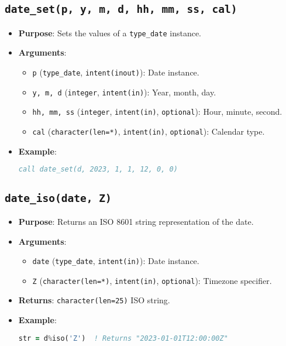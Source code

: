 \documentclass[12pt,a4paper]{report}
\begin{document}
\subsection{\texttt{date\_set(p, y, m, d, hh, mm, ss, cal)}}
\begin{itemize}
\item \textbf{Purpose}: Sets the values of a \texttt{type\_date} instance.
\item \textbf{Arguments}:
\begin{itemize}
\item \texttt{p} (\texttt{type\_date}, \texttt{intent(inout)}): Date instance.
\item \texttt{y, m, d} (\texttt{integer}, \texttt{intent(in)}): Year, month, day.
\item \texttt{hh, mm, ss} (\texttt{integer}, \texttt{intent(in)}, \texttt{optional}): Hour, minute, second.
\item \texttt{cal} (\texttt{character(len=*)}, \texttt{intent(in)}, \texttt{optional}): Calendar type.
\end{itemize}
\item \textbf{Example}:
\begin{lstlisting}[language=Fortran]
call date_set(d, 2023, 1, 1, 12, 0, 0)
\end{lstlisting}
\end{itemize}

\subsection{\texttt{date\_iso(date, Z)}}
\begin{itemize}
\item \textbf{Purpose}: Returns an ISO 8601 string representation of the date.
\item \textbf{Arguments}:
\begin{itemize}
\item \texttt{date} (\texttt{type\_date}, \texttt{intent(in)}): Date instance.
\item \texttt{Z} (\texttt{character(len=*)}, \texttt{intent(in)}, \texttt{optional}): Timezone specifier.
\end{itemize}
\item \textbf{Returns}: \texttt{character(len=25)} ISO string.
\item \textbf{Example}:
\begin{lstlisting}[language=Fortran]
str = d%iso('Z')  ! Returns "2023-01-01T12:00:00Z"
\end{lstlisting}
\end{itemize}
\end{document}
